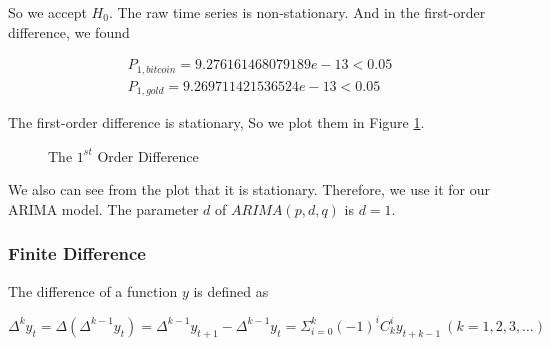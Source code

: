 \documentclass[12pt,a4paper]{article}
\begin{document}
\begin{spacing}{1.2}
So we accept $H_0$. The raw time series is non-stationary.
And in the first-order difference, we found


\begin{align*}
	P_{1,bitcoin}=9.276161468079189e-13 < 0.05 \\
	P_{1,gold}=9.269711421536524e-13 < 0.05
\end{align*}

The first-order difference is stationary, So we plot them in Figure \ref{fig:diff}. 

\begin{figure}
	\begin{center}
		\caption{The $1^{st}$ Order Difference}
		\label{fig:diff}
	\end{center}
\end{figure}

We also can see from the plot that it is stationary. Therefore, we use it for our ARIMA model. The parameter $d$ of $ARIMA(p,d,q)$ is $d=1$.

\subsubsection{Finite Difference}

The difference of a function $y$ is defined as

$$
\Delta^k y_t = \Delta(\Delta^{k-1}y_t)=\Delta^{k-1}y_{t+1}-\Delta^{k-1}y_t=\Sigma_{i=0}^k(-1)^i C_k^iy_{t+k-1} \ (k=1,2,3,\dots)
$$


\end{spacing}
\end{document}
